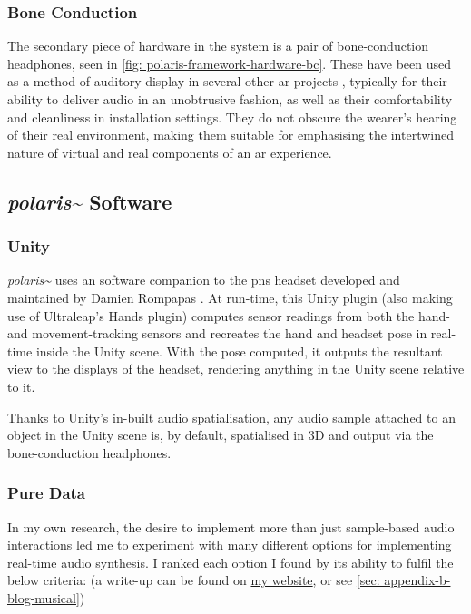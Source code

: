 \subsubsection{Bone Conduction}\label{sec: polaris-framework-hardware-bc}
The secondary piece of hardware in the system is a pair of bone-conduction headphones, seen in \autoref{fig: polaris-framework-hardware-bc}. These have been used as a method of auditory display in several other \gls{ar} projects \citep{lindeman2008,barde2016,chevalier2018}, typically for their ability to deliver audio in an unobtrusive fashion, as well as their comfortability and cleanliness in installation settings. They do not obscure the wearer's hearing of their real environment, making them suitable for emphasising the intertwined nature of virtual and real components of an \gls{ar} experience.


\subsection{\textit{polaris\textasciitilde{}} Software}\label{sec: polaris-framework-software}
\subsubsection{Unity}\label{sec: polaris-framework-software-unity}
\textit{polaris\textasciitilde{}} uses an  software companion to the \gls{pns} headset developed and maintained by Damien Rompapas \citeyearpar{rompapas2020}. At run-time, this Unity plugin (also making use of Ultraleap's Hands plugin) computes sensor readings from both the hand- and movement-tracking sensors and recreates the hand and headset pose in real-time inside the Unity scene. With the pose computed, it outputs the resultant view to the displays of the headset, rendering anything in the Unity scene relative to it.

Thanks to Unity's in-built audio spatialisation, any audio sample attached to an object in the Unity scene is, by default, spatialised in 3D and output via the bone-conduction headphones.

\subsubsection{Pure Data}\label{sec: polaris-framework-software-puredata}
In my own research, the desire to implement more than just sample-based audio interactions led me to experiment with many different options for implementing real-time audio synthesis. I ranked each option I found by its ability to fulfil the below criteria: (a write-up can be found on \href{https://sambilbow.github.io/projects/polaris/software.html}{my website}, or see \autoref{sec: appendix-b-blog-musical})

